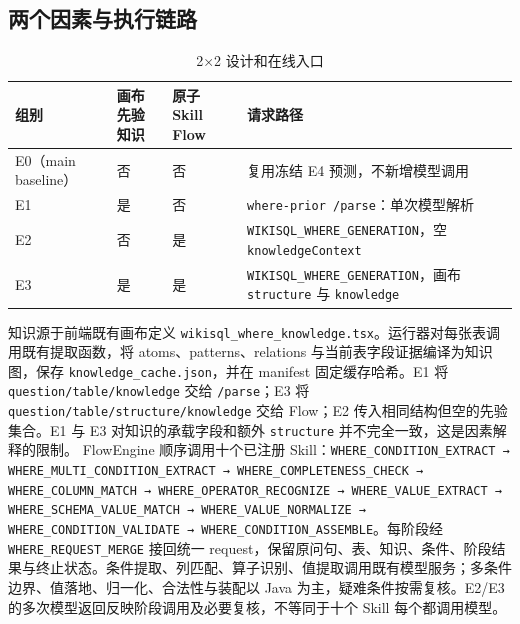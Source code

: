 \documentclass[conference]{IEEEtran}
\begin{document}
\subsection{两个因素与执行链路}
\begin{table}[t]
\centering
\footnotesize
\caption{2×2 设计和在线入口}
\label{tab:t3}
\begin{tabular}{@{}>{\raggedright\arraybackslash}p{3.52cm}>{\centering\arraybackslash}p{2.38cm}>{\centering\arraybackslash}p{2.88cm}>{\raggedright\arraybackslash}p{8.42cm}@{}}
\toprule
组别 & 画布先验知识 & 原子 Skill Flow & 请求路径 \\
\midrule
E0（main baseline） & 否 & 否 & 复用冻结 E4 预测，不新增模型调用 \\
E1 & 是 & 否 & \texttt{where-prior /\allowbreak{}parse}：单次模型解析 \\
E2 & 否 & 是 & \texttt{WIKISQL\_WHERE\_GENERATION}，空 \texttt{knowledgeContext} \\
E3 & 是 & 是 & \texttt{WIKISQL\_WHERE\_GENERATION}，画布 \texttt{structure} 与 \texttt{knowledge} \\
\bottomrule
\end{tabular}
\end{table}
知识源于前端既有画布定义 \texttt{wikisql\_where\_knowledge.tsx}。运行器对每张表调用既有提取函数，将 atoms、patterns、relations 与当前表字段证据编译为知识图，保存 \texttt{knowledge\_cache.json}，并在 manifest 固定缓存哈希。E1 将 \texttt{question/\allowbreak{}table/\allowbreak{}knowledge} 交给 \texttt{/\allowbreak{}parse}；E3 将 \texttt{question/\allowbreak{}table/\allowbreak{}structure/\allowbreak{}knowledge} 交给 Flow；E2 传入相同结构但空的先验集合。E1 与 E3 对知识的承载字段和额外 \texttt{structure} 并不完全一致，这是因素解释的限制。
FlowEngine 顺序调用十个已注册 Skill：\texttt{WHERE\_CONDITION\_EXTRACT → WHERE\_MULTI\_CONDITION\_EXTRACT → WHERE\_COMPLETENESS\_CHECK → WHERE\_COLUMN\_MATCH → WHERE\_OPERATOR\_RECOGNIZE → WHERE\_VALUE\_EXTRACT → WHERE\_SCHEMA\_VALUE\_MATCH → WHERE\_VALUE\_NORMALIZE → WHERE\_CONDITION\_VALIDATE → WHERE\_CONDITION\_ASSEMBLE}。每阶段经 \texttt{WHERE\_REQUEST\_MERGE} 接回统一 request，保留原问句、表、知识、条件、阶段结果与终止状态。条件提取、列匹配、算子识别、值提取调用既有模型服务；多条件边界、值落地、归一化、合法性与装配以 Java 为主，疑难条件按需复核。E2/E3 的多次模型返回反映阶段调用及必要复核，不等同于十个 Skill 每个都调用模型。
\end{document}
